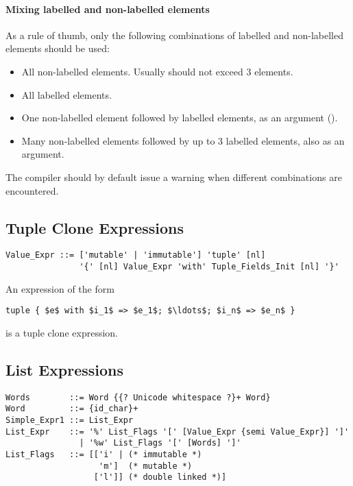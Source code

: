 \paragraph{Mixing labelled and non-labelled elements}
As a rule of thumb, only the following combinations of labelled and non-labelled elements should be used:
\begin{itemize}
  \item All non-labelled elements. Usually should not exceed 3 elements.
  \item All labelled elements.  
  \item One non-labelled element followed by labelled elements, as an argument (). 
  \item Many non-labelled elements followed by up to 3 labelled elements, also as an argument. 
\end{itemize}
The compiler should by default issue a warning when different combinations are encountered. 





\subsection{Tuple Clone Expressions}
\label{sec:tuple-clone}

\syntax\begin{lstlisting}
Value_Expr ::= ['mutable' | 'immutable'] 'tuple' [nl] 
               '{' [nl] Value_Expr 'with' Tuple_Fields_Init [nl] '}'
\end{lstlisting}

An expression of the form 
\begin{lstlisting}
tuple { $e$ with $i_1$ => $e_1$; $\ldots$; $i_n$ => $e_n$ }
\end{lstlisting}
is a tuple clone expression. 





\subsection{List Expressions}
\label{sec:list-expressions}

\syntax\begin{lstlisting}
Words        ::= Word {{? Unicode whitespace ?}+ Word}
Word         ::= {id_char}+
Simple_Expr1 ::= List_Expr
List_Expr    ::= '%' List_Flags '[' [Value_Expr {semi Value_Expr}] ']'
               | '%w' List_Flags '[' [Words] ']'
List_Flags   ::= [['i' | (* immutable *)
                   'm']  (* mutable *)
                  ['l']] (* double linked *)]
\end{lstlisting}

